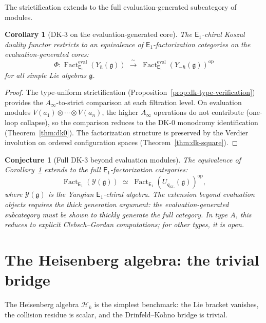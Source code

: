 \documentclass[11pt,reqno]{amsart}
\newtheorem{corollary}[theorem]{Corollary}
\newtheorem{conjecture}[theorem]{Conjecture}
\theoremstyle{definition}
\theoremstyle{remark}
\newcommand{\cH}{\mathcal{H}}
\newcommand{\Ainf}{A_{\infty}}
\newcommand{\Eone}{\mathsf{E}_{1}}
\newcommand{\fg}{\mathfrak{g}}
\newcommand{\op}{\mathrm{op}}
\newcommand{\cY}{\mathcal{Y}}
\numberwithin{equation}{section}
\begin{document}
The strictification extends to the full evaluation-generated
subcategory of modules.

\begin{corollary}[DK-3 on the evaluation-generated core]
\label{cor:dk3-eval-core}
The $\Eone$-chiral Koszul duality functor restricts to an
equivalence of $\Eone$-factorization categories on the
evaluation-generated cores:
\[
\Phi \colon
\operatorname{Fact}_{\Eone}^{\mathrm{eval}}(Y_\hbar(\fg))
\;\xrightarrow{\;\sim\;}\;
\operatorname{Fact}_{\Eone}^{\mathrm{eval}}
(Y_{-\hbar}(\fg))^{\op}
\]
for all simple Lie algebras $\fg$.
\end{corollary}

\begin{proof}
The type-uniform strictification
(Proposition~\ref{prop:dk-type-verification}) provides
the $\Ainf$-to-strict comparison at each filtration level.
On evaluation modules $V(a_1) \otimes \cdots \otimes V(a_n)$,
the higher $\Ainf$ operations do not contribute (one-loop
collapse), so the comparison reduces to the DK-0 monodromy
identification (Theorem~\ref{thm:dk0}).  The factorization
structure is preserved by the Verdier involution on ordered
configuration spaces
(Theorem~\ref{thm:dk-square}).
\end{proof}

\begin{conjecture}[Full DK-3 beyond evaluation modules]
\label{conj:dk3-full}
The equivalence of
Corollary~\textup{\ref{cor:dk3-eval-core}} extends to the
full $\Eone$-factorization categories:
\[
\operatorname{Fact}_{\Eone}(\cY(\fg))
\;\simeq\;
\operatorname{Fact}_{\Eone}(U_{q_{\mathrm{KL}}}(\fg))^{\op},
\]
where $\cY(\fg)$ is the Yangian $\Eone$-chiral algebra.
The extension beyond evaluation objects requires the thick
generation argument: the evaluation-generated subcategory
must be shown to thickly generate the full category.  In
type $A$, this reduces to explicit Clebsch--Gordan
computations; for other types, it is open.
\end{conjecture}

\section{The Heisenberg algebra: the trivial bridge}
\label{sec:dk-heis}

The Heisenberg algebra $\cH_k$ is the simplest benchmark:
the Lie bracket vanishes, the collision residue is scalar,
and the Drinfeld--Kohno bridge is trivial.
\end{document}
